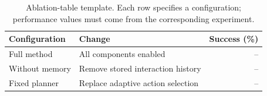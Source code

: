 \begin{table}[H]
  \centering
  \caption{Ablation-table template. Each row specifies a configuration;
  performance values must come from the corresponding experiment.}
  \label{tab:ablation}
  \small
  \renewcommand{\arraystretch}{1.15}
  \setlength{\tabcolsep}{5pt}
  \begin{tabularx}{\linewidth}{lXr}
    \toprule
    \textbf{Configuration} & \textbf{Change} & \textbf{Success (\%)} \\
    \midrule
    Full method & All components enabled & -- \\
    Without memory & Remove stored interaction history & -- \\
    Fixed planner & Replace adaptive action selection & -- \\
    \bottomrule
  \end{tabularx}
\end{table}
